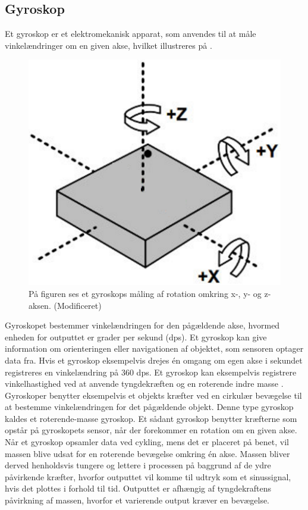 \subsection{Gyroskop}
Et gyroskop er et elektromekanisk apparat, som anvendes til at måle vinkelændringer om en given akse, hvilket illustreres på . 
\begin{figure}[H]
	\centering
	\includegraphics[scale=0.4]{figures/bProblemloesning/gyro.png}
	\caption{På figuren ses et gyroskops måling af rotation omkring x-, y- og z-aksen. \citep{Sparkfun_gyro} (Modificeret)}
	\label{fig:gyro}
\end{figure}\vspace{-.25cm}
Gyroskopet bestemmer vinkelændringen for den pågældende akse, hvormed enheden for outputtet er grader per sekund (dps). Et gyroskop kan give information om orienteringen eller navigationen af objektet, som sensoren optager data fra. Hvis et gyroskop eksempelvis drejes én omgang om egen akse i sekundet registreres en vinkelændring på 360 dps. \citep{Sparkfun_gyro,Barbour2014} \newline
Et gyroskop kan eksempelvis registrere vinkelhastighed ved at anvende tyngdekræften og en roterende indre masse \citep{Sparkfun_gyro,Barbour2014}.\\
Gyroskoper benytter eksempelvis et objekts kræfter ved en cirkulær bevægelse til at bestemme vinkelændringen for det pågældende objekt. Denne type gyroskop kaldes et roterende-masse gyroskop. Et sådant gyroskop benytter kræfterne som opstår på gyroskopets sensor, når der forekommer en rotation om en given akse. Når et gyroskop opsamler data ved cykling, mens det er placeret på benet, vil massen blive udsat for en roterende bevægelse omkring én akse. Massen bliver derved henholdsvis tungere og lettere i processen på baggrund af de ydre påvirkende kræfter, hvorfor outputtet vil komme til udtryk som et sinussignal, hvis det plottes i forhold til tid. Outputtet er afhængig af tyngdekraftens påvirkning af massen, hvorfor et varierende output kræver en bevægelse. \citep{TittertonWeston2004,Barbour2014,LuingeVeltink2005}

